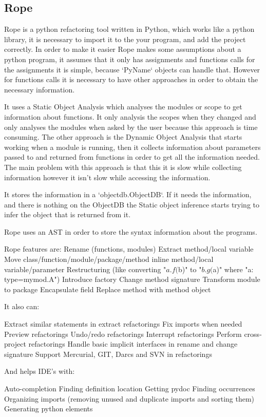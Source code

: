 \subsection{Rope}

Rope is a python refactoring tool written in Python, which works like a python library, it is necessary to import it to the your program, and add the project correctly.
In order to make it easier Rope makes some assumptions about a python program, it assumes that it only has assignments and functions calls %
for the assignments it is simple, because `PyName` objects can handle that. However for functions calls it is necessary to have other approaches in order to obtain the necessary information. 

It uses a Static Object Analysis which analyses the modules or scope to get information about functions. It only analysis the scopes when they changed and only analyses the modules when asked by the user because this approach is time consuming. The other approach is the Dynamic Object Analysis that starts working when a module is running, then it collects information about parameters passed to and returned from functions in order to get all the information needed. The main problem with this approach is that this it is slow while collecting information however it isn't slow while accessing the information.

It stores the information in a `objectdb.ObjectDB`. If it needs the information, and there is nothing on the ObjectDB the Static object inference starts trying to infer the object that is returned from it.

Rope uses an AST in order to store the syntax information about the programs.

Rope features are: 
	Rename (functions, modules)
	Extract method/local variable
	Move class/function/module/package/method
	inline method/local variable/parameter
	Restructuring (like converting "${a}.f(${b})" to "${b}.g(${a})" where "a: type=mymod.A") 
	Introduce factory
	Change method signature
	Transform module to package
	Encapsulate field
	Replace method with method object

It also can:

    Extract similar statements in extract refactorings
    Fix imports when needed
    Preview refactorings
    Undo/redo refactorings
    Interrupt refactorings
    Perform cross-project refactorings
    Handle basic implicit interfaces in rename and change signature
    Support Mercurial, GIT, Darcs and SVN in refactorings

And helps IDE's with:

    Auto-completion
    Finding definition location
    Getting pydoc
    Finding occurrences
    Organizing imports (removing unused and duplicate imports and sorting them)
    Generating python elements



